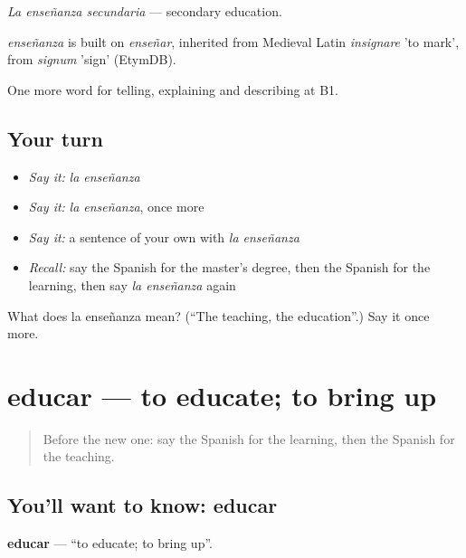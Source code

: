 \emph{La enseñanza secundaria} — secondary education.

\begin{cousinweb}
\emph{enseñanza} is built on \emph{enseñar}, inherited from Medieval Latin \emph{insignare} 'to mark', from \emph{signum} 'sign' (EtymDB).
\end{cousinweb}

\begin{grammarlens}[title={What you've built}]
One more word for telling, explaining and describing at B1.
\end{grammarlens}

\subsection*{Your turn}
\begin{itemize}
\raggedright
  \item \emph{Say it:} \emph{la enseñanza}
  \item \emph{Say it:} \emph{la enseñanza}, once more
  \item \emph{Say it:} a sentence of your own with \emph{la enseñanza}
  \item \emph{Recall:} say the Spanish for the master's degree, then the Spanish for the learning, then say \emph{la enseñanza} again
\end{itemize}

\begin{tcolorbox}[breakable,colback=teal!4,colframe=teal!35!black,title={Before you move on}]
What does la enseñanza mean? (\textquotedblleft{}The teaching, the education\textquotedblright{}.) Say it once more.
\end{tcolorbox}
\section[educar]{educar — to educate; to bring up}

\label{lesson:ES-C597-educar}



\begin{quote}
Before the new one: say the Spanish for the learning, then the Spanish for the teaching.
\end{quote}

\subsection*{You'll want to know: educar}
\textbf{educar} — \textquotedblleft{}to educate; to bring up\textquotedblright{}.

